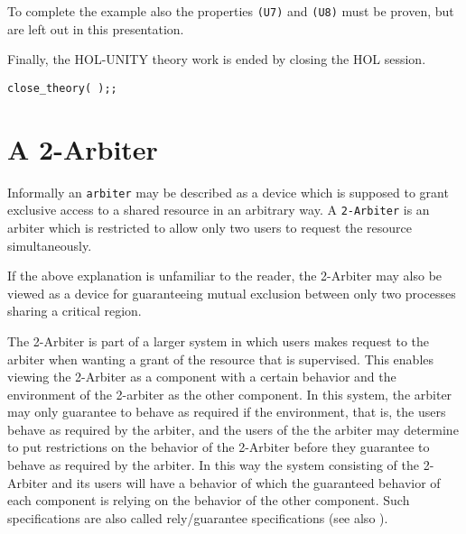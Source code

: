 To complete the example also the properties {\tt (U7)} and {\tt (U8)} must be
proven, but are left out in this presentation.

Finally, the HOL-UNITY theory work is ended by closing the HOL session.
{\footnotesize
\begin{verbatim}
close_theory( );;
\end{verbatim}
}


\section{A 2-Arbiter} \label{sec:2-Arbiter}

Informally an {\tt arbiter} may be described as a device which is supposed to 
grant exclusive access to a shared resource in an arbitrary way.  A 
{\tt 2-Arbiter} is an arbiter which is restricted to allow only two users to 
request the resource simultaneously.

If the above explanation is unfamiliar to the reader, the 2-Arbiter may also be 
viewed as a device for guaranteeing mutual exclusion between only two processes
sharing a critical region.

The 2-Arbiter is part of a larger system in which users makes request to the
arbiter when wanting a grant of the resource that is supervised.  This enables
viewing the 2-Arbiter as a component with a certain behavior and the
environment of the 2-arbiter as the other component.  In this system, the
arbiter may only guarantee to behave as required if the environment, that is,
the users behave as required by the arbiter, and the users of the the arbiter
may determine to put restrictions on the behavior of the 2-Arbiter before they
guarantee to behave as required by the arbiter.  In this way the system
consisting of the 2-Arbiter and its users will have a behavior of which the
guaranteed behavior of each component is relying on the behavior of the other
component.  Such specifications are also called rely/guarantee specifications
(see also \cite{St85,GrHHL90}).

